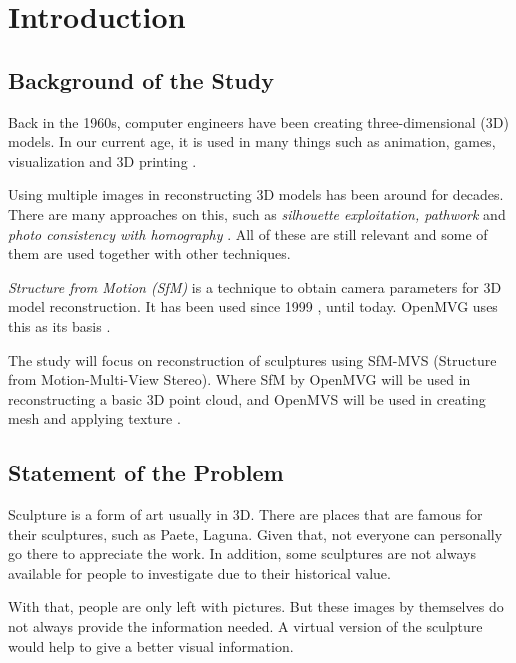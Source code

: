 \documentclass[journal]{./IEEE/IEEEtran}
\title{\SPTITLE}
\author{\ADVISEE~and~\ADVISER%
}
\begin{document}
\maketitle


\section{Introduction}

\subsection{Background of the Study}
Back in the 1960s, computer engineers have been creating three-dimensional (3D) models. In our current age, it is used in many things such as animation, games, visualization and 3D printing \cite{Archicgi}.

Using multiple images in reconstructing 3D models has been around for decades. There are many approaches on this, such as \textit{silhouette exploitation, pathwork} and \textit{photo consistency with homography} \cite{Paris}. All of these are still relevant and some of them are used together with other techniques.

\textit{Structure from Motion (SfM)} is a technique to obtain camera parameters for 3D model reconstruction. It has been used since 1999 \cite{Jebaraa}, until today. OpenMVG uses this as its basis \cite{OpenMVG}.

The study will focus on reconstruction of sculptures using SfM-MVS (Structure from Motion-Multi-View Stereo). Where SfM by OpenMVG will be used in reconstructing a basic 3D point cloud, and OpenMVS will be used in creating mesh and applying texture \cite{OpenMVS}.

\subsection{Statement of the Problem}
Sculpture is a form of art usually in 3D. There are places that are famous for their sculptures, such as Paete, Laguna. Given that, not everyone can personally go there to appreciate the work. In addition, some sculptures are not always available for people to investigate due to their historical value. \cite{art}

With that, people are only left with pictures. But these images by themselves do not always provide the information needed. A virtual version of the sculpture would help to give a better visual information.
\end{document}
